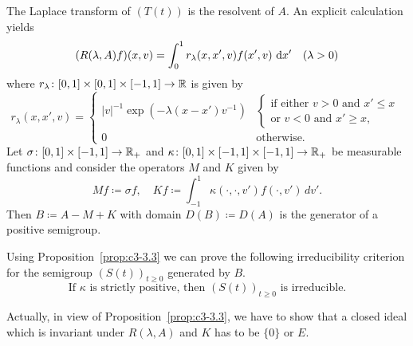 \begin{examples}
\begin{enumerate}[(a), wide]
	The Laplace transform of $(T(t))$ is the resolvent of $A$.
	An explicit calculation yields
	\begin{equation}\label{eq:c3-3.5}
		(R(\lambda,A)f)(x,v) = \int_{0}^{1} r_{\lambda}(x,x',v)f(x',v)\,\mathop{}\!\mathrm{d}{x}' \quad (\lambda > 0)
	\end{equation}
	where $r_{\lambda} \colon [0,1] \times [0,1] \times [-1,1] \to \mathbb{R} $ is given by
	\begin{equation*}\label{eq:c3-r_lambda}
		r_{\lambda}(x,x',v) = \begin{cases}
			|v|^{-1}\exp(-\lambda(x-x')v^{-1}) & 
			\begin{cases}\text{if either } v>0 \text{ and } x'\leq x \\
		    \text{or } v<0 \text{ and } x'\geq x, 
		    \end{cases}\\
			0 & \text{otherwise}.
		\end{cases}
	\end{equation*}
	Let $\sigma \colon [0,1]\times[-1,1] \to \mathbb{R} _{+}$ and $\kappa \colon [0,1]\times[-1,1]\times[-1,1] \to \mathbb{R} _{+}$ be measurable functions and consider the operators $M$ and $K$ given by
	\begin{equation}\label{eq:c3-3.6}
		Mf \coloneqq \sigma f, \quad Kf \coloneqq \int_{-1}^{1} \kappa(\cdot,\cdot,v')f(\cdot,v')\,dv'.
	\end{equation}
	Then $B \coloneqq A - M + K$ with domain $D(B) \coloneqq D(A)$ is the generator of a positive semigroup.
	
	Using Proposition~\ref{prop:c3-3.3} we can prove the following irreducibility criterion for the semigroup $(S(t))_{t\geq 0}$ generated by $B$.
	\begin{equation}\label{eq:c3-3.7}
		\text{If } \kappa \text{ is strictly positive, then } (S(t))_{t\geq 0} \text{ is irreducible.}
	\end{equation}
	
	Actually, in view of Proposition~\ref{prop:c3-3.3}, we have to show that a closed ideal which is invariant under $R(\lambda,A)$ and $K$ has to be $\{0\}$ or $E$.
	

\end{enumerate}
\end{examples}
